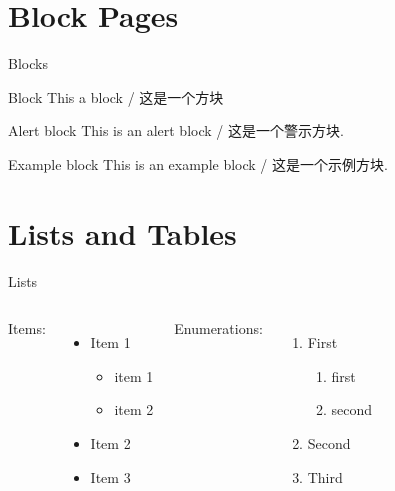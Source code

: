 \documentclass{beamer}
\begin{document}
\section{Block Pages}

\begin{frame}{Blocks}
    \begin{block}{Block}
        This a block / 这是一个方块
    \end{block}
    \pause
    \begin{alertblock}{Alert block}
        This is an alert block / \textcolor{alert}{这是一个警示方块}.
    \end{alertblock}
    \pause
    \begin{exampleblock}{Example block}
        This is an example block / \textcolor{example}{这是一个示例方块}.
    \end{exampleblock}
\end{frame}

\section{Lists and Tables}

\begin{frame}{Lists}
    \begin{columns}[t, onlytextwidth]
            Items:
            \begin{itemize}
                \item Item 1
                \begin{itemize}
                    \item item 1
                    \item item 2
                \end{itemize}
                \item Item 2
                \item Item 3
            \end{itemize}
        
            Enumerations:
            \begin{enumerate}
                \item First
                \begin{enumerate}
                    \item first
                    \item second
                \end{enumerate}
                \item Second
                \item Third
            \end{enumerate}
    \end{columns}
\end{frame}
\end{document}
